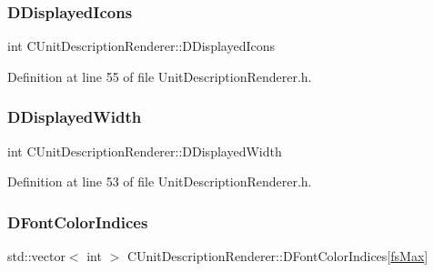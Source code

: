\hypertarget{classCUnitDescriptionRenderer_a0f2d234d02c615ac28812508c77ec414}{}\label{classCUnitDescriptionRenderer_a0f2d234d02c615ac28812508c77ec414} 
\subsubsection{\texorpdfstring{D\+Displayed\+Icons}{DDisplayedIcons}}
{\footnotesize\ttfamily int C\+Unit\+Description\+Renderer\+::\+D\+Displayed\+Icons\hspace{0.3cm}{\ttfamily [protected]}}



Definition at line 55 of file Unit\+Description\+Renderer.\+h.

\hypertarget{classCUnitDescriptionRenderer_a4c472ecc82b5956fc65aeebb2faf17fd}{}\label{classCUnitDescriptionRenderer_a4c472ecc82b5956fc65aeebb2faf17fd} 
\subsubsection{\texorpdfstring{D\+Displayed\+Width}{DDisplayedWidth}}
{\footnotesize\ttfamily int C\+Unit\+Description\+Renderer\+::\+D\+Displayed\+Width\hspace{0.3cm}{\ttfamily [protected]}}



Definition at line 53 of file Unit\+Description\+Renderer.\+h.

\hypertarget{classCUnitDescriptionRenderer_acb9416ccf452db38d4817711cd9d6abb}{}\label{classCUnitDescriptionRenderer_acb9416ccf452db38d4817711cd9d6abb} 
\subsubsection{\texorpdfstring{D\+Font\+Color\+Indices}{DFontColorIndices}}
{\footnotesize\ttfamily std\+::vector$<$ int $>$ C\+Unit\+Description\+Renderer\+::\+D\+Font\+Color\+Indices\mbox{[}\hyperlink{classCUnitDescriptionRenderer_a3ea4cd83b6dd9533ab3abb953a7da35aa74218e4708bac1eab359099eb0b159b2}{fs\+Max}\mbox{]}\hspace{0.3cm}{\ttfamily [protected]}}



